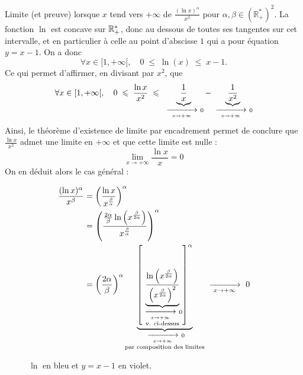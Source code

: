\documentclass{article}
\begin{document}
\begin{question_kholle}{Limite (et preuve) lorsque $x$ tend vers $+\infty$ de $\displaystyle\frac{(\ln x)^{\alpha}}{x^{\beta}}$ pour $\alpha ,\beta \in \left( \mathbb{R}_+^*\right) ^2$.}
	La fonction $\ln$ est concave sur $\mathbb R_+^*$, donc au dessous de toutes ses tangentes sur cet intervalle, et en particulier à celle au point d'abscisse $1$ qui a pour équation $y=x-1$. On a donc
	\[
		\forall x \in [1,+\infty[, \quad 0 \; \leq \; \ln (x) \; \leq \; x-1.
	\]
	Ce qui permet d'affirmer, en divisant par $x^2$, que
	\[
		\forall{x}\in [1,+\infty[, \quad 0 \; \leqslant \; \frac{\ln x}{x^2} \; \leqslant \; \underbrace{\frac{1}{x}}_{\ \xrightarrow[\;x \to +\infty\;]{}\ 0} - \underbrace{\frac{1}{x^2}}_{\ \xrightarrow[\;x \to +\infty\;]{}\ 0}
	\]
	Ainsi, le théorème d'existence de limite par encadrement permet de conclure que $\frac{\ln x}{x^2}$ admet une limite en $+\infty$ et que cette limite est nulle :
	\[
		\lim_{x\to+\infty}\frac{\ln x}{x} = 0
	\]
	On en déduit alors le cas général :
	\\
	\begin{minipage}{0.7\textwidth}
		\begin{align*}
			\frac{(\ln x)^\alpha}{x^\beta} & = \left(\frac{\ln x}{x^{\frac{\beta}{\alpha}}}\right)^{\alpha}                                                                                                                                              \\
			                               & = \left(\frac{\frac{2\alpha}{\beta}\ln\left(x^{\frac{\beta}{2\alpha}}\right)}{x^{\frac{\beta}{\alpha}}}\right)^{\alpha}                                                                                     \\
			                               & = \left(\frac{2\alpha}{\beta}\right)^{\alpha} \underbrace{\left[\underbrace{\frac{\ln\left(x^{\frac{\beta}{2\alpha}}\right)}{\left(x^{\frac{\beta}{2\alpha}}\right)^{2}}}_{\substack{\ \xrightarrow[\;x \to +\infty\;]{}\ 0 \\\text{\scriptsize v. ci-dessus}}}\right]^{\alpha}}_{\substack{\ \xrightarrow[\;x \to +\infty\;]{}\ 0\\\text{par composition des limites}}} \ \xrightarrow[\;x \to +\infty\;]{}\  0
		\end{align*}
	\end{minipage}
	\begin{minipage}{0.3\textwidth}
		\begin{figure}[H]
			\centering
			\caption{$\ln$ en bleu et $y=x-1$ en violet.}
		\end{figure}
	\end{minipage}
\end{question_kholle}
\end{document}
